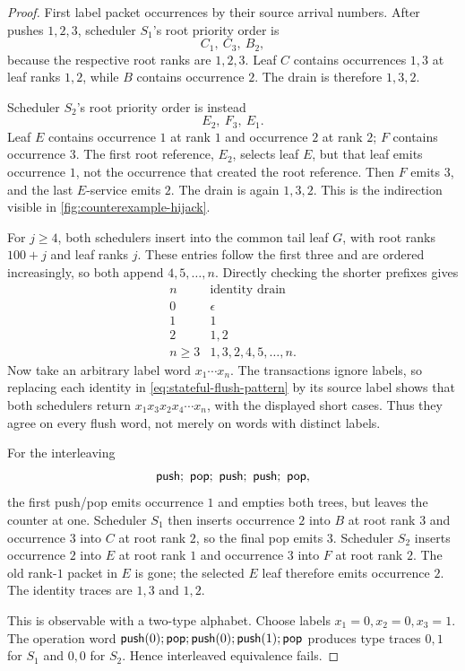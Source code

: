 \begin{proof}
First label packet occurrences by their source arrival numbers.  After pushes
\(1,2,3\), scheduler \(S_1\)'s root priority order is
\[
  C_1,\ C_3,\ B_2,
\]
because the respective root ranks are \(1,2,3\).  Leaf \(C\) contains
occurrences \(1,3\) at leaf ranks \(1,2\), while \(B\) contains occurrence
\(2\).  The drain is therefore \(1,3,2\).

Scheduler \(S_2\)'s root priority order is instead
\[
  E_2,\ F_3,\ E_1.
\]
Leaf \(E\) contains occurrence \(1\) at rank \(1\) and occurrence \(2\) at
rank \(2\); \(F\) contains occurrence \(3\).  The first root reference,
\(E_2\), selects leaf \(E\), but that leaf emits occurrence \(1\), not the
occurrence that created the root reference.  Then \(F\) emits \(3\), and the
last \(E\)-service emits \(2\).  The drain is again \(1,3,2\).  This is the
indirection visible in \autoref{fig:counterexample-hijack}.

For \(j\ge4\), both schedulers insert into the common tail leaf \(G\), with
root ranks \(100+j\) and leaf ranks \(j\).  These entries follow the first
three and are ordered increasingly, so both append \(4,5,\ldots,n\).  Directly
checking the shorter prefixes gives
\begin{equation}
 \begin{array}{c|c}
 n & \text{identity drain}\ \\
 \hline
 0 & \epsilon\\
 1 & 1\\
 2 & 1,2\\
 n\ge3 & 1,3,2,4,5,\ldots,n.
 \end{array}
 \label{eq:stateful-flush-pattern}
\end{equation}
Now take an arbitrary label word \(x_1\cdots x_n\).  The transactions ignore
labels, so replacing each identity in \autoref{eq:stateful-flush-pattern} by its
source label shows that both schedulers return
\(x_1x_3x_2x_4\cdots x_n\), with the displayed short cases.  Thus they agree
on every flush word, not merely on words with distinct labels.

For the interleaving
\begin{equation}
  \push;\ \popop;\ \push;\ \push;\ \popop,
  \label{eq:diverging-ops}
\end{equation}
the first push/pop emits occurrence \(1\) and empties both trees, but leaves
the counter at one.  Scheduler \(S_1\) then inserts occurrence \(2\) into
\(B\) at root rank \(3\) and occurrence \(3\) into \(C\) at root rank \(2\),
so the final pop emits \(3\).  Scheduler \(S_2\) inserts occurrence \(2\) into
\(E\) at root rank \(1\) and occurrence \(3\) into \(F\) at root rank \(2\).
The old rank-\(1\) packet in \(E\) is gone; the selected \(E\) leaf therefore
emits occurrence \(2\).  The identity traces are \(1,3\) and \(1,2\).

This is observable with a two-type alphabet.  Choose labels
\(x_1=0,x_2=0,x_3=1\).  The operation word
\(\mathsf{push}(0);\mathsf{pop};\mathsf{push}(0);\mathsf{push}(1);\mathsf{pop}\) produces type traces
\(0,1\) for \(S_1\) and \(0,0\) for \(S_2\).  Hence interleaved equivalence
fails.
\end{proof}

